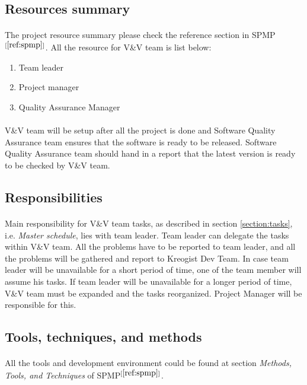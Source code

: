 \documentclass[11pt,a4paper]{article}
\begin{document}
        \subsection{Resources summary}
            \paragraph{} The project resource summary please check the reference section in SPMP$^{[\ref{ref:spmp}]}$. All the resource for V\&V team is list below:
                \begin{enumerate}
                    \item Team leader
                    \item Project manager
                    \item Quality Assurance Manager
                \end{enumerate}
            \paragraph{} V\&V team will be setup after all the project is done and Software Quality Assurance team ensures that the software is ready to be released. Software Quality Assurance team should hand in a report that the latest version is ready to be checked by V\&V team.
        \subsection{Responsibilities}
            \paragraph{} Main responsibility for V\&V team tasks, as described in section \ref{section:tasks}, i.e. \emph{Master schedule}, lies with team leader. Team leader can delegate the tasks within V\&V team. All the problems have to be reported to team leader, and all the problems will be gathered and report to Kreogist Dev Team. In case team leader will be unavailable for a short period of time, one of the team member will assume his tasks. If team leader will be unavailable for a longer period of time, V\&V team must be expanded and the tasks reorganized. Project Manager will be responsible for this.
        \subsection{Tools, techniques, and methods}
            \paragraph{} All the tools and development environment could be found at section \emph{Methods, Tools, and Techniques} of SPMP$^{[\ref{ref:spmp}]}$.
\end{document}
